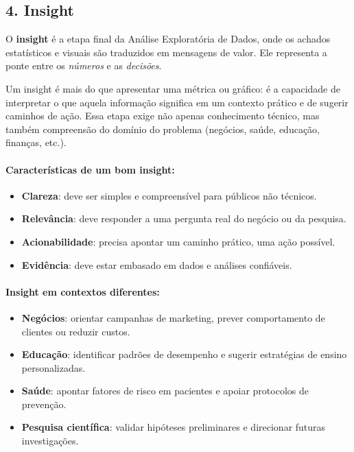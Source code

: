 \subsection*{4. Insight}

O \textbf{insight} é a etapa final da Análise Exploratória de Dados, onde os achados estatísticos e visuais são traduzidos em mensagens de valor. Ele representa a ponte entre os \textit{números} e as \textit{decisões}. 

Um insight é mais do que apresentar uma métrica ou gráfico: é a capacidade de interpretar o que aquela informação significa em um contexto prático e de sugerir caminhos de ação. Essa etapa exige não apenas conhecimento técnico, mas também compreensão do domínio do problema (negócios, saúde, educação, finanças, etc.).

\paragraph{Características de um bom insight:}
\begin{itemize}[leftmargin=*]
  \item \textbf{Clareza}: deve ser simples e compreensível para públicos não técnicos.
  \item \textbf{Relevância}: deve responder a uma pergunta real do negócio ou da pesquisa.
  \item \textbf{Acionabilidade}: precisa apontar um caminho prático, uma ação possível.
  \item \textbf{Evidência}: deve estar embasado em dados e análises confiáveis.
\end{itemize}

\paragraph{Insight em contextos diferentes:}
\begin{itemize}[leftmargin=*]
  \item \textbf{Negócios}: orientar campanhas de marketing, prever comportamento de clientes ou reduzir custos.
  \item \textbf{Educação}: identificar padrões de desempenho e sugerir estratégias de ensino personalizadas.
  \item \textbf{Saúde}: apontar fatores de risco em pacientes e apoiar protocolos de prevenção.
  \item \textbf{Pesquisa científica}: validar hipóteses preliminares e direcionar futuras investigações.
\end{itemize}

